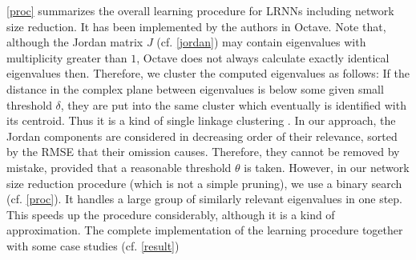 \documentclass{sn-jnl}
\theoremstyle{definition}
\begin{document}
\cref{proc} summarizes the overall learning procedure for LRNNs including
network size reduction. It has been implemented by the authors in Octave. Note
that, although the Jordan matrix $J$ (cf. \cref{jordan}) may
contain eigenvalues with multiplicity greater than $1$, Octave does not always
calculate exactly identical eigenvalues then. Therefore, we cluster the
computed eigenvalues as follows: If the distance in the complex plane between
eigenvalues is below some given small threshold $\delta$, they are put into the
same cluster which eventually is identified with its centroid. Thus it is a kind
of single linkage clustering \citep{GR69}. In our approach, the Jordan
components are considered in decreasing order of their relevance, sorted by the
RMSE that their omission causes. Therefore, they cannot be removed by
mistake, provided that a reasonable threshold $\theta$ is taken. However, in our
network size reduction procedure (which is not a simple pruning), we use a
binary search (cf. \cref{proc}). It handles a large group of similarly relevant
eigenvalues in one step. This speeds up the procedure considerably, although it
is a kind of approximation.
The complete implementation of the learning procedure together with some case
studies (cf. \cref{result})
\end{document}

